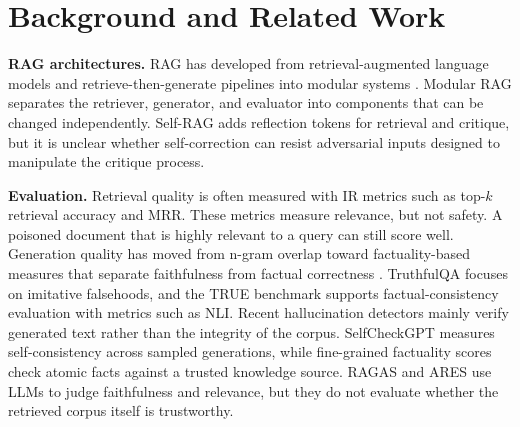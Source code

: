 \section{Background and Related Work}
\label{sec:background}

\textbf{RAG architectures.} RAG has developed from retrieval-augmented language models \cite{guu2020realm} and retrieve-then-generate pipelines \cite{izacard2021fid} into modular systems \cite{gao2024retrieval}. Modular RAG separates the retriever, generator, and evaluator into components that can be changed independently. Self-RAG \cite{asai2024selfrag} adds reflection tokens for retrieval and critique, but it is unclear whether self-correction can resist adversarial inputs designed to manipulate the critique process.

\textbf{Evaluation.} Retrieval quality is often measured with IR metrics such as top-$k$ retrieval accuracy \cite{karpukhin2020dense} and MRR. These metrics measure relevance, but not safety. A poisoned document that is highly relevant to a query can still score well. Generation quality has moved from n-gram overlap toward factuality-based measures that separate faithfulness from factual correctness \cite{maynez2020faithfulness}. TruthfulQA \cite{lin2022truthfulqa} focuses on imitative falsehoods, and the TRUE benchmark \cite{honovich2022true} supports factual-consistency evaluation with metrics such as NLI. Recent hallucination detectors mainly verify generated text rather than the integrity of the corpus. SelfCheckGPT \cite{manakul2023selfcheckgpt} measures self-consistency across sampled generations, while fine-grained factuality scores \cite{min2023factscore} check atomic facts against a trusted knowledge source. RAGAS \cite{es2024ragas} and ARES \cite{saadfalcon2024ares} use LLMs to judge faithfulness and relevance, but they do not evaluate whether the retrieved corpus itself is trustworthy.

